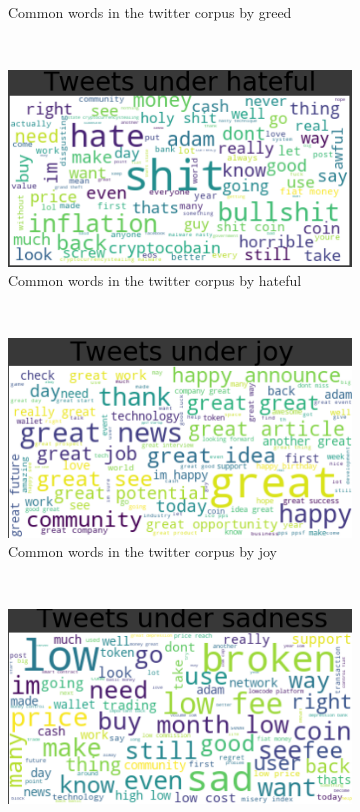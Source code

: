 \documentclass[a4paper, 12pt]{article}
\begin{document}
\begin{figure}[H]
\begin{subfigure}[c]{0.3\textwidth}
        \caption{Common words in the twitter corpus by greed}
    \end{subfigure}
		~ %
    \begin{subfigure}[d]{0.3\textwidth}
        \includegraphics[width=\textwidth]{res/wordcloud_hateful.png}
        \caption{Common words in the twitter corpus by hateful}
    \end{subfigure}
    ~ %
    \begin{subfigure}[e]{0.3\textwidth}
        \includegraphics[width=\textwidth]{res/wordcloud_joy.png}
        \caption{Common words in the twitter corpus by joy}
    \end{subfigure}
		~ %
    \begin{subfigure}[f]{0.3\textwidth}
        \includegraphics[width=\textwidth]{res/wordcloud_sadness.png}

\end{subfigure}
\end{figure}
\end{document}

